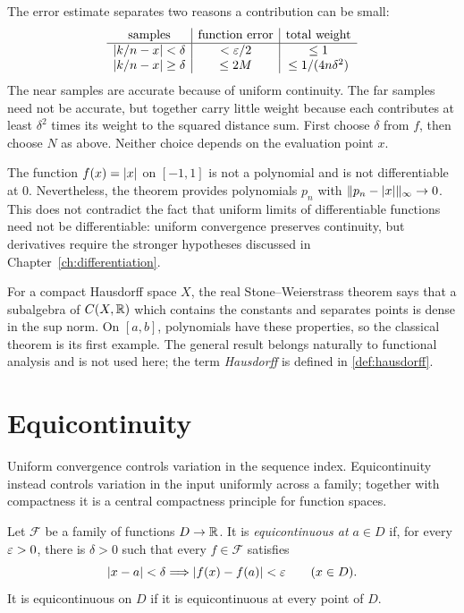 The error estimate separates two reasons a contribution can be small:
\[
\begin{array}{c|c|c}
\text{samples}&\text{function error}&\text{total weight}\\\hline
|k/n-x|<\delta&<\varepsilon/2&\leq1\\
|k/n-x|\geq\delta&\leq2M&\leq1/(4n\delta^2)
\end{array}
\]
The near samples are accurate because of uniform continuity. The far
samples need not be accurate, but together carry little weight because
each contributes at least $\delta^2$ times its weight to the squared
distance sum. First choose $\delta$ from $f$, then choose $N$ as above.
Neither choice depends on the evaluation point $x$.
\begin{example}
The function $f(x)=\lvert x\rvert$ on $[-1,1]$ is not a polynomial and is not
differentiable at $0$.  Nevertheless, the theorem provides polynomials
$p_n$ with $\lVert p_n-\lvert x\rvert\rVert_\infty\to0$.  This does not contradict the
fact that uniform limits of differentiable functions need not be
differentiable: uniform convergence preserves continuity, but derivatives
require the stronger hypotheses discussed in Chapter~\ref{ch:differentiation}.
\end{example}

\begin{remark}
For a compact Hausdorff space $X$, the real Stone--Weierstrass theorem says
that a subalgebra of $C(X,\mathbb{R})$ which contains the constants and separates
points is dense in the sup norm.  On $[a,b]$, polynomials have these
properties, so the classical theorem is its first example.  The general
result belongs naturally to functional analysis and is not used here; the
term \emph{Hausdorff} is defined in \cref{def:hausdorff}.
\end{remark}

\section{Equicontinuity}

Uniform convergence controls variation in the sequence index.  Equicontinuity
instead controls variation in the input uniformly across a family; together
with compactness it is a central compactness principle for function spaces.

\begin{definition}[Equicontinuity]
Let $\mathcal F$ be a family of functions $D\to\mathbb{R}$. It is \emph{equicontinuous at $a\in D$} if, for every $\varepsilon>0$, there is $\delta>0$ such that every $f\in\mathcal F$ satisfies
\[
\lvert x-a\rvert<\delta\Longrightarrow\lvert f(x)-f(a)\rvert<\varepsilon
\qquad(x\in D).
\]
It is equicontinuous on $D$ if it is equicontinuous at every point of $D$.
\end{definition}

